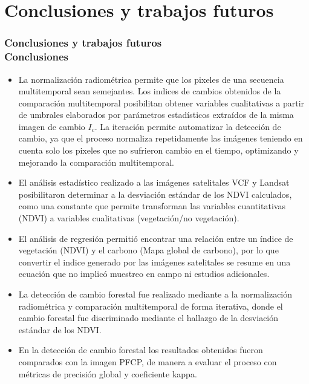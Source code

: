 \documentclass[xcolor=table]{beamer}
\begin{document}
																\section{Conclusiones y trabajos futuros}	
																\begin{frame}
																	\frametitle{Conclusiones y trabajos futuros\\Conclusiones}						
																	
																	\begin{itemize} \scriptsize
																		\item La normalizaci\'on radiom\'etrica permite que los pixeles de una secuencia multitemporal sean semejantes. Los indices de cambios obtenidos de la comparaci\'on multitemporal posibilitan obtener variables cualitativas a partir de umbrales elaborados por par\'ametros estad\'isticos extra\'idos de la misma imagen de cambio $ I_{c} $. La iteraci\'on permite automatizar la detecci\'on de cambio, ya que el proceso normaliza repetidamente las im\'agenes teniendo en cuenta solo los pixeles que no sufrieron cambio en el tiempo, optimizando y mejorando la comparaci\'on multitemporal.
																		\item El an\'alisis estad\'istico realizado a las im\'agenes satelitales VCF y Landsat posibilitaron determinar a la desviaci\'on est\'andar de los NDVI calculados, como una constante que permite transforman las variables cuantitativas (NDVI) a variables cualitativas (vegetaci\'on/no vegetaci\'on).
																		\item El an\'alisis de regresi\'on permiti\'o encontrar una relaci\'on entre un \'indice de vegetaci\'on (NDVI) y el carbono (Mapa global de carbono), por lo que convertir el indice generado por las im\'agenes satelitales se resume en una ecuaci\'on que no implic\'o muestreo en campo ni estudios adicionales.
																		\item La detecci\'on de cambio forestal fue realizado mediante a la normalizaci\'on radiom\'etrica y comparaci\'on multitemporal de forma iterativa, donde el cambio forestal fue discriminado mediante el hallazgo de la desviaci\'on est\'andar de los NDVI. 
																		\item En la detecci\'on de cambio forestal los resultados obtenidos fueron comparados con la imagen PFCP, de manera a evaluar el proceso con m\'etricas de precisi\'on global y coeficiente kappa.
																	\end{itemize}

																	
																	
																\end{frame}															
\end{document}
